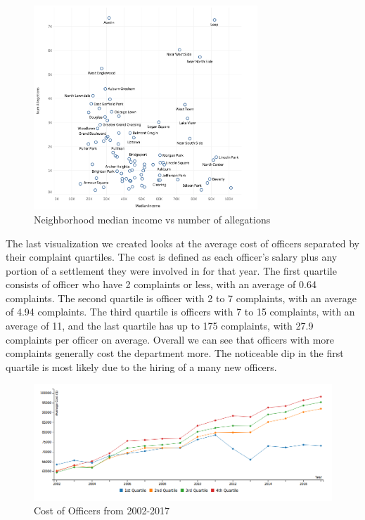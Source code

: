 \documentclass[11pt]{article}
\begin{document}
\begin{figure}[h]
\centering
\caption{Neighborhood median income vs number of allegations}
\includegraphics[width=0.75\textwidth]{scatter.png}
\end{figure}

The last visualization we created looks at the average cost of officers separated by their complaint quartiles. The cost is defined as each officer's salary plus any portion of a settlement they were involved in for that year. The first quartile consists of officer who have 2 complaints or less, with an average of 0.64 complaints. The second quartile is officer with 2 to 7 complaints, with an average of 4.94 complaints. The third quartile is officers with 7 to 15 complaints, with an average of 11, and the last quartile has up to 175 complaints, with 27.9 complaints per officer on average. Overall we can see that officers with more complaints generally cost the department more. The noticeable dip in the first quartile is most likely due to the hiring of a many new officers.

\begin{figure}[h]
\caption{Cost of Officers from 2002-2017}
\includegraphics[width=\textwidth]{costline.png}
\end{figure}
\end{document}
